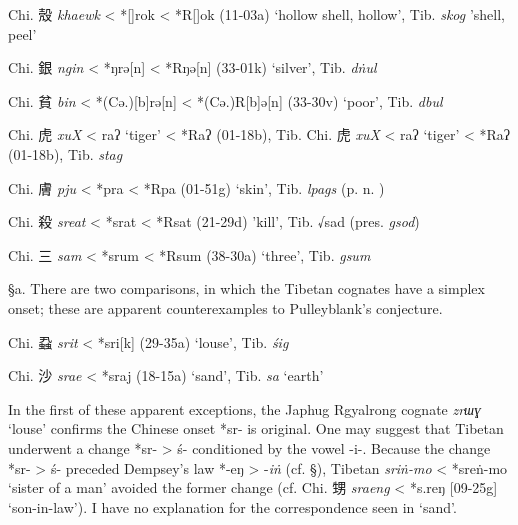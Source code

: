 \begin{description} \item
Chi. 殼  \emph{khaewk} \textless{} *[{}]{}rok \textless{}
*R{[}{}]{}ok (11-03a) `hollow shell, hollow', Tib. {} \emph{skog}
'shell, peel'
\item
Chi. 銀  \emph{ngin} \textless{} *ŋrə[n] \textless{} *Rŋə[n]
(33-01k) `silver', Tib. {} \emph{dṅul}
\item
Chi. 貧  \emph{bin} \textless{} *(Cə.){[}b]rə[n] \textless{}
*(Cə.)R{[}b]ə[n] (33-30v) `poor', Tib. {} \emph{dbul}
\item
Chi. 虎  \emph{xuX} \textless{} {}{}raʔ `tiger' \textless{} *R{}{}aʔ
(01-18b), 
Tib. 
Chi. 虎 \emph{xuX}
\textless{} {}{}raʔ `tiger' \textless{} *R{}{}aʔ (01-18b), Tib. {} \emph{stag}
\item
Chi. 膚  \emph{pju} \textless{} *pra \textless{} *Rpa (01-51g) `skin',
Tib. {} \emph{lpags} (p. n. )
\item
Chi. 殺  \emph{sreat} \textless{} *srat \textless{} *Rsat (21-29d)
'kill', Tib. √sad (pres. {} \emph{gsod})
\item
Chi. 三  \emph{sam} \textless{} *srum \textless{} *Rsum (38-30a) `three',
Tib. {} \emph{gsum}
\end{description}

§a. There are two comparisons, in which the Tibetan cognates have a
simplex onset; these are apparent counterexamples to Pulleyblank's
conjecture.

\begin{description} \item
Chi. 蝨  \emph{srit} \textless{} *sri{[}k] (29-35a) `louse', Tib. {} \emph{śig}
\item Chi. 沙  \emph{srae} \textless{} *s{}raj (18-15a) `sand', Tib. {} \emph{sa} `earth'
\end{description}

In the first of these apparent exceptions, the Japhug Rgyalrong cognate
 \emph{zrɯɣ} `louse' confirms the Chinese onset *sr- is original. One may
suggest that Tibetan underwent a change *sr- \textgreater{} ś-
conditioned by the vowel -i-. Because the change *sr- \textgreater{} ś-
preceded Dempsey's law *-eŋ \textgreater{} -\emph{iṅ} (cf. §), Tibetan {} \emph{sriṅ-mo} \textless{} *sreṅ-mo `sister of a man' avoided
the former change (cf. Chi. 甥 \emph{sraeng} \textless{} *s.reŋ
{[}09-25g] `son-in-law'). I have no explanation for the correspondence
seen in `sand'.


